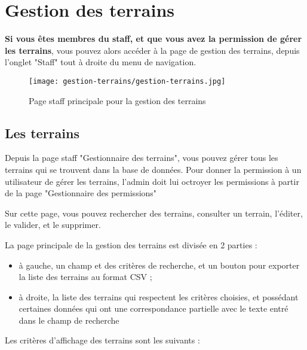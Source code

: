 \section{Gestion des terrains}

\textbf{Si vous êtes membres du staff, et que vous avez la permission de gérer les terrains}, vous pouvez alors accéder à la page de gestion des terrains, depuis l'onglet "Staff" tout à droite du menu de navigation.

\begin{figure}[H]
\centering
\texttt{[image: gestion-terrains/gestion-terrains.jpg]}
\caption{Page staff principale pour la gestion des terrains}
\end{figure}

\subsection{Les terrains}

Depuis la page staff "Gestionnaire des terrains", vous pouvez gérer tous les terrains qui se trouvent dans la base de données. Pour donner la permission à un utilisateur de gérer les terrains, l'admin doit lui octroyer les permissions à partir de la page "Gestionnaire des permissions"

\bigskip

Sur cette page, vous pouvez rechercher des terrains, consulter un terrain, l'éditer, le valider, et le supprimer.\newline

La page principale de la gestion des terrains est divisée en 2 parties :

\begin{itemize}
\item  à gauche, un champ et des critères de recherche, et un bouton pour exporter la liste des terrains au format CSV ;
\item à droite, la liste des terrains qui respectent les critères choisies, et possédant certaines données qui ont une correspondance partielle avec le texte entré dans le champ de recherche
\end{itemize}
\bigskip

Les critères d'affichage des terrains sont les suivants :

